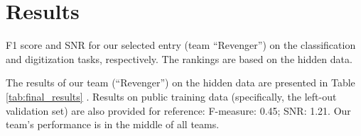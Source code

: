 \section{Results}
\label{sec:results}

\begin{table}[!htp]
\centering

\caption{F1 score and SNR for our selected entry (team ``Revenger'') on the classification and digitization tasks, respectively. The rankings are based on the hidden data.}
\label{tab:final_results}
\end{table}

The results of our team (``Revenger'') on the hidden data \cite{reyna2024_cinc2024_database} are presented in Table \ref{tab:final_results}
. Results on public training data (specifically, the left-out validation set) are also provided for reference: F-measure: 0.45; SNR: 1.21. Our team's performance is in the middle of all teams.
